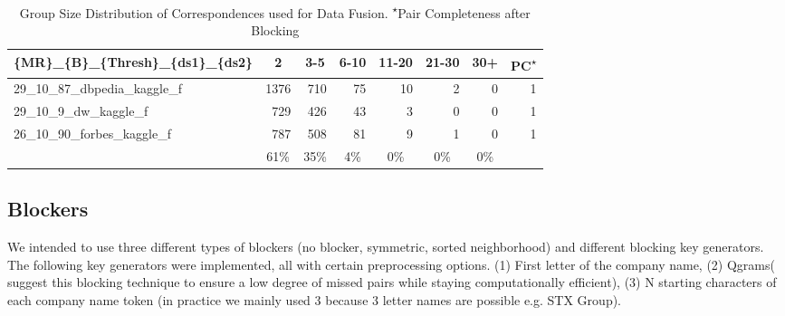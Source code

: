 \documentclass[11pt,titlepage,oneside,openany]{article}
\begin{document}
\begin{table}[]
	\centering
	\small
	\begin{tabular}{lrrrrrrr}
		\textbf{\{MR\}\_\{B\}\_\{Thresh\}\_\{ds1\}\_\{ds2\}} & \multicolumn{1}{c}{\textbf{2}} & \multicolumn{1}{c}{\textbf{3-5}} & \multicolumn{1}{c}{\textbf{6-10}} & \multicolumn{1}{c}{\textbf{11-20}} & \multicolumn{1}{c}{\textbf{21-30}} & \multicolumn{1}{c}{\textbf{30+}} & \multicolumn{1}{c}{\textbf{PC\textsuperscript{$\star$}}} \\\hline
		29\_10\_87\_dbpedia\_kaggle\_f              & 1376                           & 710                              & 75                                & 10                                 & 2                                  & 0                                & 1                               \\
		29\_10\_9\_dw\_kaggle\_f                    & 729                            & 426                              & 43                                & 3                                  & 0                                  & 0                                & 1                               \\
		26\_10\_90\_forbes\_kaggle\_f               & 787                            & 508                              & 81                                & 9                                  & 1                                  & 0                                & 1                               \\\hline
		\multicolumn{1}{c}{}                        & \multicolumn{1}{c}{61\%}       & \multicolumn{1}{c}{35\%}         & \multicolumn{1}{c}{4\%}           & \multicolumn{1}{c}{0\%}            & \multicolumn{1}{c}{0\%}            & \multicolumn{1}{c}{0\%}          & \multicolumn{1}{c}{}           
	\end{tabular}
	\caption[Group Size Distribution of Correspondences used for Data Fusion]{Group Size Distribution of Correspondences used for Data Fusion. \small\textsuperscript{$\star$}Pair Completeness after Blocking}
	\label{tab:group-size-dist}
\end{table}


\subsection{Blockers}
\label{sec:blockers}
We intended to use three different types of blockers (no blocker, symmetric, sorted neighborhood) and different blocking key generators. The following key generators were implemented, all with certain preprocessing options. (1) First letter of the company name, (2) Qgrams(\citep{gravano_approximate_2001} suggest this blocking technique to ensure a low degree of missed pairs while staying computationally efficient), (3) N starting characters of each company name token (in practice we mainly used 3 because 3 letter names are possible e.g. STX Group).
\end{document}
